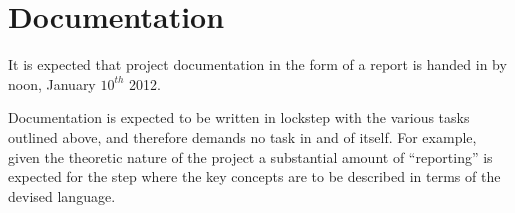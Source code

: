 \section{Documentation}

It is expected that project documentation in the form of a report is handed in 
by noon, January $10^{th}$ 2012.

Documentation is expected to be written in lockstep with the various tasks 
outlined above, and therefore demands no task in and of itself. For example, 
given the theoretic nature of the project a substantial amount of ``reporting'' 
is expected for the step where the key concepts are to be described in terms of 
the devised language.
